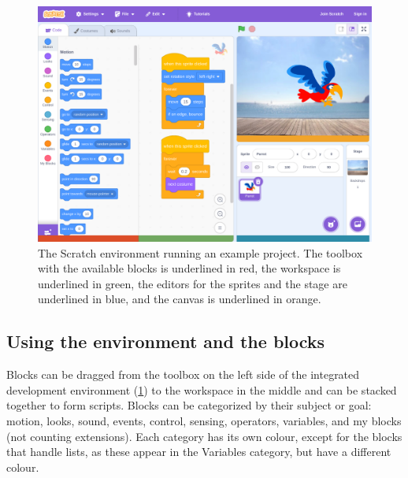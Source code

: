 \documentclass[../main]{subfiles}
\begin{document}
\begin{figure}
    \begin{wide}
        \includegraphics[width=\linewidth]{./scratch-ide}
    \end{wide}
    \caption{The Scratch environment running an example project.
    The toolbox with the available blocks is underlined in \textcolor{ugent-re}{red}, the workspace is underlined in \textcolor{ugent-ps}{green}, the editors for the sprites and the stage are underlined in \textcolor{ugent-we}{blue}, and the canvas is underlined in \textcolor{ugent-lw}{orange}.}
    \label{fig:scratch-environment}
\end{figure}

\subsection{Using the environment and the blocks}\label{subsec:using-the-environment-and-the-blocks}

Blocks can be dragged from the toolbox on the left side of the integrated development environment (\cref{fig:scratch-environment}) to the workspace in the middle and can be stacked together to form scripts.
Blocks can be categorized by their subject or goal: \textcolor{scrmove}{motion}, \textcolor{scrlook}{looks}, \textcolor{scrsound}{sound}, \textcolor{screvent}{events}, \textcolor{scrcontrol}{control}, \textcolor{scrsensing}{sensing}, \textcolor{scroperator}{operators}, \textcolor{scrvariable}{variables}, and \textcolor{scrmoreblocks}{my blocks} (not counting extensions).
Each category has its own colour, except for the blocks that handle lists, as these appear in the \textcolor{scrvariable}{Variables} category, but have a different colour.
\end{document}
